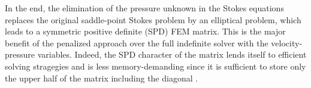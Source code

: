 In the end, the elimination of the pressure unknown in the Stokes equations
replaces the original saddle-point Stokes problem \cite{begl05} by an elliptical problem, 
which leads to a symmetric positive definite (SPD) FEM matrix. 
This is the major benefit of the penalized approach 
over the full indefinite solver with the velocity-pressure variables. Indeed, the SPD character of the matrix lends itself 
to efficient solving stragegies and is less memory-demanding since it is sufficient to store only the upper half of the matrix including the diagonal
\cite{gova}
.


